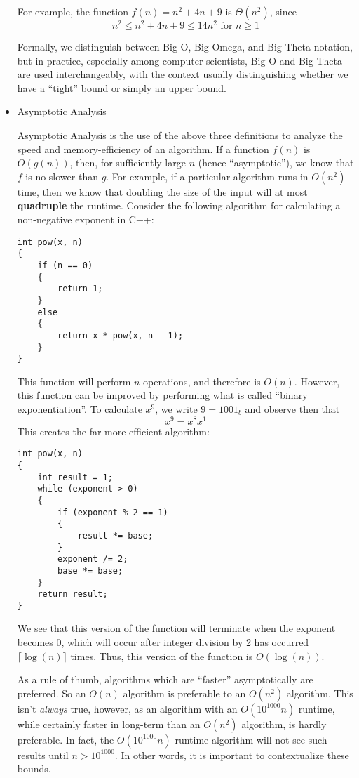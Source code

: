 \documentclass[a4paper]{article}
\begin{document}
\begin{itemize}
For example, the function $f(n)=n^2+4n+9$ is $\Theta(n^2)$, since \[n^2 \leq n^2+4n+9\leq14n^2\text{ for } n\geq1\]

Formally, we distinguish between Big O, Big Omega, and Big Theta notation, but in practice, especially among computer scientists, Big O and Big Theta are used interchangeably, with the context usually distinguishing whether we have a ``tight'' bound or simply an upper bound. 

\item Asymptotic Analysis

Asymptotic Analysis is the use of the above three definitions to analyze the speed and memory-efficiency of an algorithm. If a function $f(n)$ is $O(g(n))$, then, for sufficiently large $n$ (hence ``asymptotic''), we know that $f$ is no slower than $g$. For example, if a particular algorithm runs in $O(n^2)$ time, then we know that doubling the size of the input will at most \textbf{quadruple} the runtime. Consider the following algorithm for calculating a non-negative exponent in C++:

\begin{verbatim}
int pow(x, n)
{
	if (n == 0)
	{
		return 1; 
	}
	else
    {
		return x * pow(x, n - 1);
    }
}
\end{verbatim}

This function will perform $n$ operations, and therefore is $O(n)$. However, this function can be improved by performing what is called ``binary exponentiation''. To calculate $x^9$, we write $9=1001_b$ and observe then that\[x^9=x^8x^1\] This creates the far more efficient algorithm:

\begin{verbatim}
int pow(x, n)
{
	int result = 1;
	while (exponent > 0)
	{
		if (exponent % 2 == 1)
		{
			result *= base;
		}
		exponent /= 2;
		base *= base;
	}
	return result;
}
\end{verbatim}

We see that this version of the function will terminate when the exponent becomes 0, which will occur after integer division by 2 has occurred $\lceil\log(n)\rceil$ times. Thus, this version of the function is $O(\log(n))$. 

As a rule of thumb, algorithms which are ``faster'' asymptotically are preferred. So an $O(n)$ algorithm is preferable to an $O(n^2)$ algorithm. This isn't \textit{always} true, however, as an algorithm with an $O(10^{1000}n)$ runtime, while certainly faster in long-term than an $O(n^2)$ algorithm, is hardly preferable. In fact, the $O(10^{1000}n)$ runtime algorithm will not see such results until $n>10^{1000}$. In other words, it is important to contextualize these bounds. 
\end{itemize}
\end{document}
